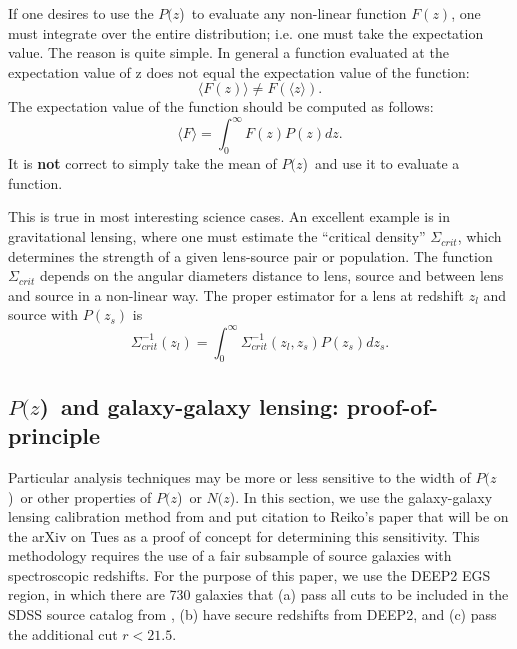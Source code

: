 \documentclass[preprint]{aastex}
\newcommand{\pofz}{$P(z$)}
\newcommand{\Nofz}{$N(z$)}
\begin{document}
If one desires to use the \pofz\ to evaluate any non-linear function $F(z)$,
one must integrate over the entire distribution; i.e. one must take the
expectation value.  The reason is quite simple. In general a function evaluated
at the expectation value of z does not equal the expectation value of the
function:
\begin{equation}
\langle F(z) \rangle \ne F(\langle z \rangle).
\end{equation}
The expectation value of the function should be computed as follows:
\begin{equation}
\langle F \rangle = \int_{0}^{\infty} F(z) P(z) dz.
\end{equation}
It is {\bf not} correct to simply take the mean of \pofz\ and use it to evaluate
a function.

This is true in most interesting science cases.  An excellent example is in
gravitational lensing, where one must estimate the ``critical density''
$\Sigma_{crit}$, which determines the strength of a given lens-source pair or
population.  The function $\Sigma_{crit}$ depends on the angular diameters
distance to lens, source and between lens and source in a non-linear way.  The
proper estimator for a lens at redshift $z_{l}$ and source with $P(z_s)$ is
\begin{equation} \label{eq:calcscrit}
\Sigma^{-1}_{crit}(z_l) = \int_{0}^{\infty} \Sigma_{crit}^{-1}(z_l, z_s) P(z_s) dz_s.
\end{equation}


\subsection{\pofz\ and galaxy-galaxy lensing: proof-of-principle} \label{sec:pofp}

Particular analysis techniques may be more or less sensitive to the width of
\pofz\ or other properties of \pofz\ or \Nofz.  In this section, we use the
galaxy-galaxy lensing calibration method from \cite{man08} and {\color{red}put
citation to Reiko's paper that will be on the arXiv on Tues} as a proof of
concept for determining this sensitivity.  This methodology requires the use of
a fair subsample of source galaxies with spectroscopic redshifts.  For the
purpose of this paper, we use the DEEP2 EGS region, in which there are 730
galaxies that (a) pass all cuts to be included in the SDSS source catalog from
\citet{MandelbaumSystematics05}, (b) have secure redshifts from DEEP2, and (c)
pass the additional cut  $r<21.5$.
\end{document}
